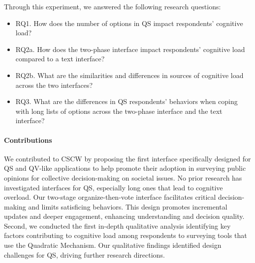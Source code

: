 Through this experiment, we answered the following research questions:

\begin{itemize}
    \item RQ1. How does the number of options in QS impact respondents' cognitive load?
    \item RQ2a. How does the two-phase interface impact respondents' cognitive load compared to a text interface?
    \item RQ2b. What are the similarities and differences in sources of cognitive load across the two interfaces?
    \item RQ3. What are the differences in QS respondents' behaviors when coping with long lists of options across the two-phase interface and the text interface?
\end{itemize}

\paragraph{Contributions}
We contributed to CSCW by proposing the first interface specifically designed for QS and QV-like applications to help promote their adoption in surveying public opinions for collective decision-making on societal issues. No prior research has investigated interfaces for QS, especially long ones that lead to cognitive overload. Our two-stage organize-then-vote interface facilitates critical decision-making and limits satisficing behaviors. This design promotes incremental updates and deeper engagement, enhancing understanding and decision quality. Second, we conducted the first in-depth qualitative analysis identifying key factors contributing to cognitive load among respondents to surveying tools that use the Quadratic Mechanism. Our qualitative findings identified design challenges for QS, driving further research directions.



